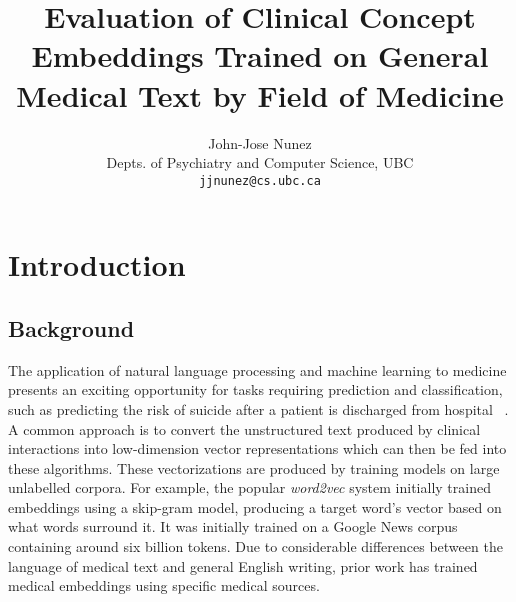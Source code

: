 \documentclass[11pt,a4paper]{article}
\title{Evaluation of Clinical Concept Embeddings Trained on General Medical Text by Field of Medicine}
\author{John-Jose Nunez\\
  Depts. of Psychiatry and Computer Science, UBC\\
  {\tt jjnunez@cs.ubc.ca} 
}
\date{}
\begin{document}
\maketitle

\section{Introduction}

\subsection{Background}



The application of natural language processing and machine learning to medicine presents an exciting opportunity for tasks requiring prediction and classification, such as predicting the risk of suicide after a patient is discharged from hospital ~\cite{mccoyImprovingPredictionSuicide2016}. A common approach is to convert the unstructured text produced by clinical interactions into low-dimension vector representations which can then be fed into these algorithms. These vectorizations are produced by training models on large unlabelled corpora. For example, the popular \emph{word2vec} system \cite{mikolovEfficientEstimationWord2013} initially trained embeddings using a skip-gram model, producing a target word's vector based on what words surround it. It was initially trained on a Google News corpus containing around six billion tokens. Due to considerable differences between the language of medical text and general English writing, prior work has trained medical embeddings using specific medical sources. 
\end{document}
